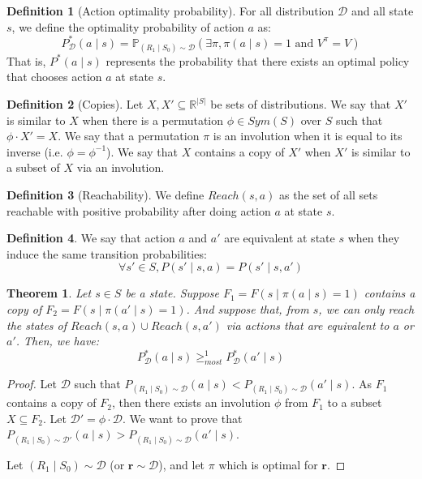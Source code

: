 \documentclass{article}
\newtheorem{theorem}{Theorem}[section]
\theoremstyle{definition}
\newtheorem{definition}{Definition}[section]
\theoremstyle{remark}
\theoremstyle{example}
\newcommand*{\rf}{\mathbf{r}}           %
\newcommand*{\D}{\mathcal{D}}
\begin{document}
\begin{definition}[Action optimality probability] %
		For all distribution $\D$ and all state $s$, we define the optimality probability of action $a$ as:
				$$P_{\D}^*(a \mid s) = \mathbb{P}_{(R_1 \mid S_0) \sim \D}(\exists \pi, \pi(a \mid s) = 1 \text{ and } V^\pi = V)$$
		That is, $P^*(a \mid s)$ represents the probability that there exists an optimal policy that chooses action $a$ at state $s$.
\end{definition}


\begin{definition}[Copies]
		Let $X, X' \subseteq \mathbb{R}^{|S|}$ be sets of distributions. We say that $X'$ is similar to $X$ when there is a permutation $\phi \in Sym(S)$ over $S$ such that $\phi \cdot X' = X$. We say that a permutation $\pi$ is an involution when it is equal to its inverse (i.e. $\phi = \phi^{-1}$). We say that $X$ contains a copy of $X'$ when $X'$ is similar to a subset of $X$ via an involution.
\end{definition}

\begin{definition}[Reachability]
		We define $Reach(s, a)$ as the set of all sets reachable with positive probability after doing action $a$ at state $s$.
\end{definition}

\begin{definition}
		We say that action $a$ and $a'$ are equivalent at state $s$ when they induce the same transition probabilities:
				$$\forall s' \in S, P(s' \mid s, a) = P(s' \mid s, a')$$
\end{definition}

\begin{theorem}
		Let $s \in S$ be a state. Suppose $F_1 = F(s \mid \pi(a \mid s) = 1)$ contains a copy of $F_2 = F(s \mid \pi(a' \mid s) = 1)$. And suppose that, from $s$, we can only reach the states of $Reach(s, a) \cup Reach(s, a')$ via actions that are equivalent to $a$ or $a'$. Then, we have:
				$$P_{\D}^*(a \mid s) \geq_{most}^1 P_{\D}^*(a' \mid s)$$
\end{theorem}

\begin{proof}
		Let $\D$ such that $P_{(R_1 \mid S_0) \sim \D}(a \mid s) < P_{(R_1 \mid S_0) \sim \D}(a' \mid s)$. As $F_1$ contains a copy of $F_2$, then there exists an involution $\phi$ from $F_1$ to a subset $X \subseteq F_2$. Let $\D' = \phi \cdot \D$. We want to prove that $P_{(R_1 \mid S_0) \sim \D'}(a \mid s) > P_{(R_1 \mid S_0) \sim \D}(a' \mid s)$.

		Let $(R_1 \mid S_0) \sim \D$ (or $\rf \sim \D$), and let $\pi$ which is optimal for $\rf$. 
\end{proof}




\end{document}
